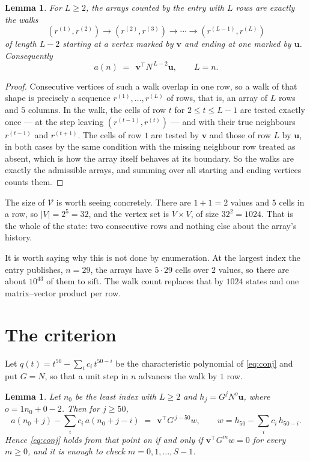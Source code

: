 \documentclass[11pt,a4paper]{article}
\theoremstyle{plain}
\newtheorem{lemma}[theorem]{Lemma}
\theoremstyle{definition}
\begin{document}
\begin{lemma}\label{lem:walk}
For $L\ge2$, the arrays counted by the entry with $L$ rows are exactly the walks
\[
(r^{(1)},r^{(2)})\to(r^{(2)},r^{(3)})\to\cdots\to(r^{(L-1)},r^{(L)})
\]
of length $L-2$ starting at a vertex marked by $\mathbf{v}$ and ending at one marked by
$\mathbf{u}$. Consequently
\[
a(n)\;=\;\,\mathbf{v}^{\!\top}N^{\,L-2}\mathbf{u},\qquad L=n .
\]
\end{lemma}

\begin{proof}
Consecutive vertices of such a walk overlap in one row, so a walk of that shape is
precisely a sequence $r^{(1)},\dots,r^{(L)}$ of rows, that is, an array of $L$ rows
and $5$ columns. In the walk, the cells of row $t$ for $2\le t\le L-1$ are tested
exactly once --- at the step leaving $(r^{(t-1)},r^{(t)})$ --- and with their true
neighbours $r^{(t-1)}$ and $r^{(t+1)}$. The cells of row $1$ are tested by
$\mathbf{v}$ and those of row $L$ by $\mathbf{u}$, in both cases by the same condition
with the missing neighbour row treated as absent, which is how the array itself behaves at
its boundary. So the walks are exactly the admissible arrays, and summing over all starting
and ending vertices counts them.
\end{proof}


The size of $\mathcal V$ is worth seeing concretely. There are $1+1=2$ values
and $5$ cells in a row, so $|V|=2^{5}=32$, and the vertex set is
$V\times V$, of size $32^2=1024$. That is the whole of the state: two consecutive
rows and nothing else about the array's history.

It is worth saying why this is not done by enumeration. At the largest index the entry
publishes, $n=29$, the arrays have $5\cdot29$ cells over
$2$ values, so there are about $10^{43}$ of them to sift. The
walk count replaces that by $1024$ states and one matrix--vector product per row.
\section{The criterion}

Let $q(t)=t^{50}-\sum_i c_i\,t^{50-i}$ be the characteristic polynomial of
\eqref{eq:conj} and put $G=N$, so that a unit step in $n$ advances the walk by
$1$ row.

\begin{lemma}\label{lem:crit}
Let $n_0$ be the least index with $L\ge2$ and $h_j=G^{j}N^{o}\mathbf{u}$, where
$o=1n_0+0-2$. Then for $j\ge50$,
\[
a(n_0+j)-\sum_i c_i\,a(n_0+j-i)\;=\;\,\mathbf{v}^{\!\top}G^{\,j-50}w,
\qquad w=h_{50}-\sum_i c_i\,h_{50-i} .
\]
Hence \eqref{eq:conj} holds from that point on if and only if
$\mathbf{v}^{\!\top}G^{m}w=0$ for every $m\ge0$, and it is enough to check
$m=0,1,\dots,S-1$.
\end{lemma}
\end{document}
